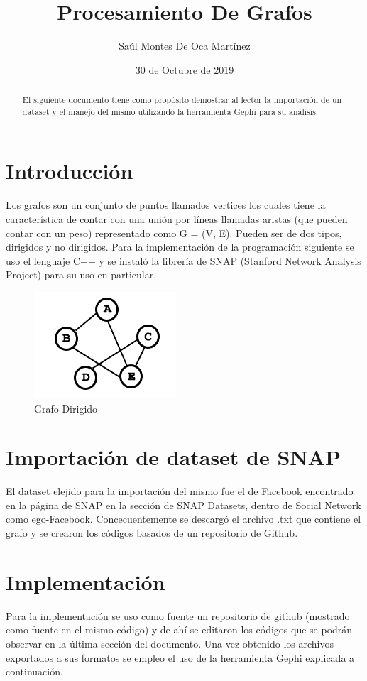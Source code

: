 \documentclass{article}
\title{Procesamiento De Grafos}
\author{Saúl Montes De Oca Martínez}
\date{30 de Octubre de 2019}
\begin{document}
\twocolumn
\maketitle
\begin{abstract}
  El siguiente documento tiene como propósito demostrar al lector la importación de un dataset y el manejo del mismo utilizando la herramienta Gephi para su análisis.
\end{abstract}
\section{Introducción}
Los grafos son un conjunto de puntos llamados vertices los cuales tiene la característica de contar con una unión por líneas llamadas aristas (que pueden contar con un peso) representado como G = (V, E). Pueden ser de dos tipos, dirigidos y no dirigidos.
Para la implementación de la programación siguiente se uso el lenguaje C++ y se instaló la librería de SNAP (Stanford Network Analysis Project) para su uso en particular.

\begin{figure}[h!]
\centering
\includegraphics[scale=1]{dirigido.gif}
\caption{Grafo Dirigido}
\label{fig:dirigido}
\end{figure}

\section{Importación de dataset de SNAP}
El dataset elejido para la importación del mismo fue el de Facebook encontrado en la página de SNAP en la sección de SNAP Datasets, dentro de Social Network como ego-Facebook. Concecuentemente se descargó el archivo .txt que contiene el grafo y se crearon los códigos basados de un repositorio de Github.

\section{Implementación}
Para la implementación se uso como fuente un repositorio de github (mostrado como fuente en el mismo código) y de ahí se editaron los códigos que se podrán observar en la última sección del documento. Una vez obtenido los archivos exportados a sus formatos se empleo el uso de la herramienta Gephi explicada a continuación.
\end{document}
